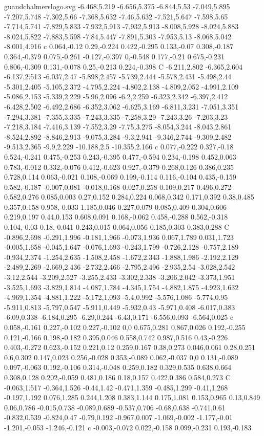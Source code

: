 \begin{filecontents}[noheader]{guandchalmerslogo.svg}
-6.468,5.219 -6.656,5.375 -6.844,5.53 -7.049,5.895 -7.207,5.748 -7.302,5.66 -7.368,5.632 -7.46,5.632 -7.521,5.647 -7.598,5.65 -7.714,5.741 -7.829,5.833 -7.932,5.913 -7.932,5.913 -8.008,5.928 -8.024,5.883 -8.024,5.822 -7.883,5.598 -7.84,5.447 -7.891,5.303 -7.953,5.13 -8.068,5.042 -8.001,4.916 c 0.064,-0.12 0.29,-0.224 0.422,-0.295 0.133,-0.07 0.308,-0.187 0.364,-0.379 0.075,-0.261 -0.127,-0.397 0,-0.548 0.177,-0.21 0.675,-0.231 0.806,-0.309 0.131,-0.078 0.25,-0.213 0.224,-0.398 C -6.211,2.802 -6.365,2.604 -6.137,2.513 -6.037,2.47 -5.898,2.457 -5.739,2.444 -5.578,2.431 -5.498,2.44 -5.301,2.405 -5.105,2.372 -4.795,2.224 -4.802,2.138 -4.809,2.052 -4.991,2.109 -5.086,2.153 -5.339,2.229 -5.96,2.096 -6.2,2.259 -6.323,2.342 -6.397,2.412 -6.428,2.502 -6.492,2.686 -6.352,3.062 -6.625,3.169 -6.811,3.231 -7.051,3.351 -7.294,3.381 -7.355,3.335 -7.243,3.335 -7.258,3.29 -7.243,3.26 -7.203,3.23 -7.218,3.184 -7.416,3.139 -7.552,3.29 -7.75,3.275 -8.054,3.244 -8.043,2.861 -8.524,2.892 -8.846,2.913 -9.075,3.284 -9.3,2.941 -9.346,2.744 -9.309,2.482 -9.513,2.365 -9.9,2.229 -10.188,2.5 -10.355,2.166 c 0.077,-0.222 0.327,-0.18 0.524,-0.241 0.475,-0.253 0.243,-0.395 0.477,-0.594 0.234,-0.198 0.452,0.063 0.783,-0.012 0.332,-0.076 0.412,-0.623 0.927,-0.379 0.268,0.126 0.386,0.235 0.728,0.114 0.063,-0.021 0.108,-0.069 0.199,-0.114 0.116,-0.104 0.435,-0.159 0.582,-0.187 -0.007,0.081 -0.018,0.168 0.027,0.258 0.109,0.217 0.496,0.272 0.582,0.276 0.085,0.003 0.27,0.152 0.284,0.224 0.068,0.342 0.171,0.392 0.38,0.485 0.357,0.158 0.958,-0.033 1.185,0.046 0.227,0.079 0.085,0.409 0.304,0.606 0.219,0.197 0.44,0.153 0.608,0.091 0.168,-0.062 0.458,-0.288 0.562,-0.318 0.104,-0.03 0.18,-0.041 0.243,0.015 0.064,0.056 0.185,0.303 0.383,0.288 C -0.896,2.698 -0.291,1.996 -0.181,1.966 -0.073,1.936 0.067,1.789 0.031,1.723 -0.005,1.658 -0.045,1.647 -0.076,1.693 -0.243,1.799 -0.726,2.128 -0.757,2.189 -0.934,2.374 -1.254,2.635 -1.508,2.458 -1.672,2.343 -1.888,1.986 -2.192,2.129 -2.489,2.269 -2.669,2.436 -2.732,2.466 -2.795,2.496 -2.935,2.54 -3.028,2.542 -3.12,2.544 -3.209,2.527 -3.255,2.433 -3.302,2.338 -3.206,2.042 -3.373,1.951 -3.525,1.693 -3.829,1.814 -4.087,1.784 -4.345,1.754 -4.882,1.875 -4.923,1.632 -4.969,1.354 -4.881,1.222 -5.172,1.093 -5.4,0.992 -5.576,1.086 -5.774,0.95 -5.911,0.813 -5.797,0.547 -5.911,0.449 -5.932,0.43 -5.971,0.408 -6.017,0.383 -6.09,0.338 -6.184,0.295 -6.29,0.244 -6.43,0.171 -6.556,0.093 -6.564,0.025 c 0.058,-0.161 0.227,-0.102 0.227,-0.102 0,0 0.675,0.281 0.867,0.026 0.192,-0.255 0.121,-0.166 0.198,-0.182 0.395,0.046 0.558,0.742 0.987,0.516 0.43,-0.226 0.403,-0.272 0.623,-0.152 0.221,0.12 0.259,0.167 0.38,0.273 0.046,0.061 0.28,0.251 0.6,0.302 0.147,0.023 0.256,-0.028 0.353,-0.089 0.062,-0.037 0,0 0.131,-0.089 0.097,-0.063 0.192,-0.106 0.314,-0.048 0.259,0.182 0.329,0.535 0.638,0.664 0.308,0.128 0.202,-0.059 0.481,0.186 0.18,0.157 0.422,0.386 0.584,0.273 C -0.063,1.517 -0.364,1.526 -0.44,1.42 -0.471,1.359 -0.485,1.299 -0.41,1.268 -0.197,1.192 0.076,1.285 0.244,1.208 0.383,1.144 0.175,1.081 0.153,0.965 0.13,0.849 0.06,0.786 -0.015,0.738 -0.089,0.689 -0.537,0.706 -0.68,0.638 -0.741,0.61 -0.832,0.539 -0.824,0.47 -0.79,0.192 -0.967,0.007 -1.069,-0.002 -1.177,-0.01 -1.201,-0.053 -1.246,-0.121 c -0.003,-0.072 0.022,-0.158 0.099,-0.231 0.193,-0.183 
\end{filecontents}
